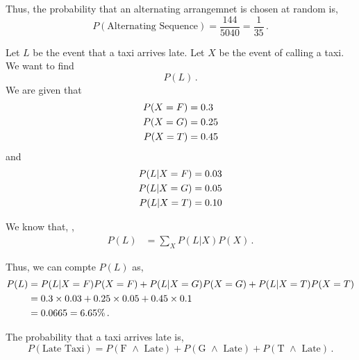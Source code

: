 \begin{subquestions}
\begin{subsubquestions}
Thus, the probability that an alternating arrangemnet is chosen at random is,
\begin{equation}
	P(\text{Alternating Sequence}) = \frac{144}{5040} = \frac{1}{35} \,.
\end{equation}

\end{subsubquestions}	
	

\subquestion

\begin{subsubquestions}
	
\subsubquestion

Let $L$ be the event that a taxi arrives late. Let $X$ be the event of calling a taxi. We want to find
\begin{equation}
	P(L)\,.
\end{equation}
We are given that
\begin{align}
	P(X=F) &= 0.3 \nonumber\\ 
	P(X=G) &= 0.25 \nonumber\\
	P(X=T) &= 0.45 
\end{align}
and
\begin{align}
	P(L|X=F) &= 0.03 \nonumber\\
	P(L|X=G) &= 0.05\nonumber\\
	P(L|X=T) &= 0.10
\end{align}

We know that, ,
\begin{align}
	P(L)&= \sum_{X} P(L|X) P(X)\,.
\end{align}

Thus, we can compte $P(L)$ as,
\begin{align}
	P(L)&= P(L|X=F) P(X=F) + P(L|X=G) P(X=G)+ P(L|X=T) P(X=T) \nonumber\\
	&=0.3 \times 0.03 +  0.25 \times 0.05 + 0.45 \times 0.1 \nonumber\\
	&=  0.0665 = 6.65\% \,.		
\end{align}



The probability that a taxi arrives late is,
\begin{equation}
	P(\text{Late Taxi}) = P(\text{F $\land$ Late}) + P(\text{G $\land$ Late}) + P(\text{T $\land$ Late}) \,.
\end{equation}
	

\end{subsubquestions}
\end{subquestions}
